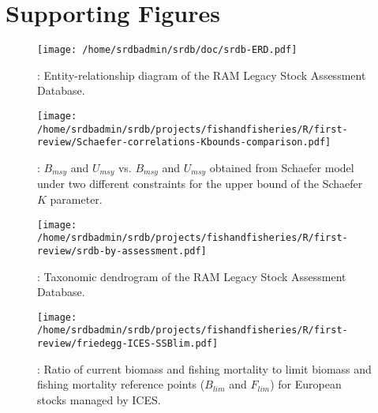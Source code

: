 \documentclass[letterpaper,12pt]{article}
\begin{document}
\renewcommand{\figurename}{Figure S}

\section*{Supporting Figures}

\begin{figure}
\begin{center}
\texttt{[image: /home/srdbadmin/srdb/doc/srdb-ERD.pdf]}
\end{center}
\caption{:  Entity-relationship diagram of the RAM Legacy Stock Assessment Database.}
\end{figure}

\begin{figure}
\begin{center}
\texttt{[image: /home/srdbadmin/srdb/projects/fishandfisheries/R/first-review/Schaefer-correlations-Kbounds-comparison.pdf]}
\end{center}
\caption{:  $B_{msy}$ and $U_{msy}$ vs. $B_{msy}$ and $U_{msy}$  obtained from Schaefer model under two different constraints for the upper bound of the Schaefer $K$ parameter.}
\end{figure}


\begin{figure}
\begin{center}
\texttt{[image: /home/srdbadmin/srdb/projects/fishandfisheries/R/first-review/srdb-by-assessment.pdf]} 
\end{center}
\caption{:  Taxonomic dendrogram of the RAM Legacy Stock Assessment Database.}
\end{figure}


\begin{figure}
\begin{center}
\texttt{[image: /home/srdbadmin/srdb/projects/fishandfisheries/R/first-review/friedegg-ICES-SSBlim.pdf]}
\end{center}
\caption{:  Ratio of current biomass and fishing mortality to limit biomass and fishing mortality reference points ($B_{lim}$ and $F_{lim}$) for European stocks managed by ICES.}
\end{figure}
\end{document}
